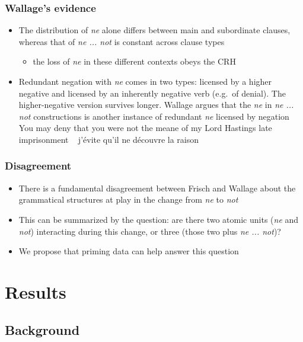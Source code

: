 \documentclass{digs-slides}
\begin{document}
\begin{frame}
    \frametitle{Wallage’s evidence}
    \begin{itemize}
      \item The distribution of \emph{ne} alone differs between main and
        subordinate clauses, whereas that of \emph{ne ... not} is
        constant across clause types
        \begin{itemize}
          \item the loss of \emph{ne} in these different contexts obeys
            the CRH
        \end{itemize}
      \item Redundant negation with \emph{ne} comes in two types:
        licensed by a higher negative and licensed by an inherently
        negative verb (e.g.\ of denial).  The higher-negative version
        survives longer.  Wallage argues that the \emph{ne} in \emph{ne
            ... not} constructions is another instance of redundant
        \emph{ne} licensed by negation
        \pause
        \ex
        You may deny that you were \alert{not} the meane of my Lord Hastings
        late imprisonment
        \xe
        \ex~
        j'évite qu'il \alert{ne} découvre la raison
        \xe
    \end{itemize}
\end{frame}

\begin{frame}
    \frametitle{Disagreement}
    \begin{itemize}
      \item There is a fundamental disagreement between Frisch and
        Wallage about the grammatical structures at play in the change from
        \emph{ne} to \emph{not}
      \item This can be summarized by the question: are there two atomic
        units (\emph{ne} and \emph{not}) interacting during this change,
        or three (those two plus \emph{ne ... not})?
      \item We propose that priming data can help answer this question
    \end{itemize}
\end{frame}

\section{Results}

\subsection{Background}
\end{document}
